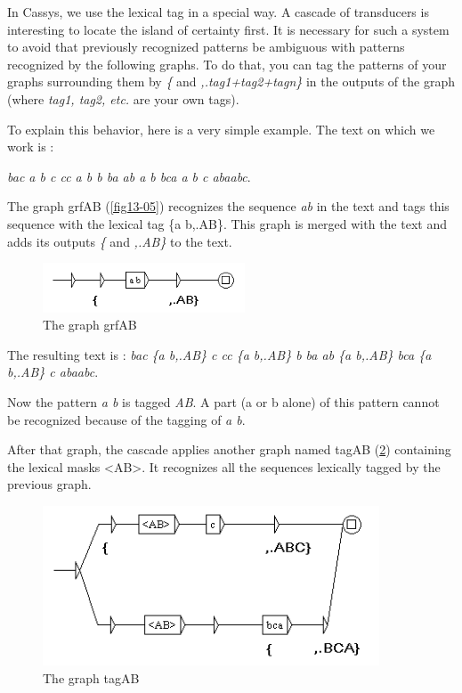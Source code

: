 \bigskip
\noindent In Cassys, we use the lexical tag in a special way. A cascade of transducers is interesting to locate the island of certainty first. It is necessary for such a system to avoid that previously recognized patterns be ambiguous with patterns recognized by the following graphs. To do that, you can tag the patterns of your graphs surrounding them by \emph{\{} and \emph{,.tag1+tag2+tagn\}} in the outputs of the graph (where \emph{tag1, tag2, etc.} are your own tags).

\bigskip
\noindent To explain this behavior, here is a very simple example. The text on which we work is :

\emph{bac a b c cc a b b ba ab a b bca a b c abaabc}.

\bigskip
\noindent The graph grfAB (\ref{fig13-05}) recognizes the sequence \emph{ab} in the text and tags this sequence with the lexical tag \{a b,.AB\}. This graph is merged with the text and adds its outputs \emph{\{ }and \emph{,.AB\}} to the text. 

\begin{figure}[!htb]
  \centering
  \includegraphics[width=6cm]{resources/img/fig13-05.png}
  \caption{The graph grfAB}
  \label{fig:fig13-05}
\end{figure}

\bigskip
\noindent The resulting text is : \emph{bac \{a b,.AB\} c cc \{a b,.AB\} b ba ab \{a b,.AB\} bca \{a b,.AB\} c abaabc}.

\bigskip
\noindent Now the pattern \emph{a b} is tagged \emph{AB}. A part (a or b alone) of this pattern cannot be recognized because of the tagging of \emph{a b}. 

\bigskip
\noindent After that graph, the cascade applies another graph named tagAB (\ref{fig13-06}) containing the lexical masks <AB>. It recognizes all the sequences lexically tagged by the previous graph.

\begin{figure}[!htb]
  \centering
  \includegraphics[width=10cm]{resources/img/fig13-06.png}
  \caption{The graph tagAB}
  \label{fig13-06}
\end{figure}

